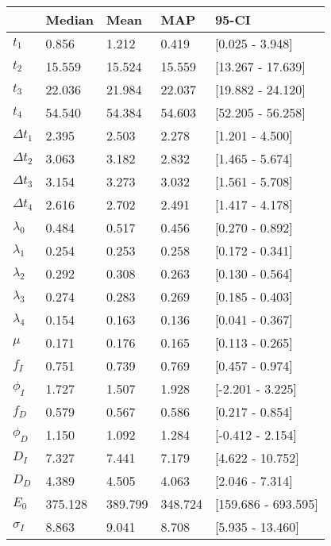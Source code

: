 \begin{tabular}{lllll}
\toprule
{} &   Median &     Mean &      MAP &                95-CI \\
\midrule
$t_1$        &    0.856 &    1.212 &    0.419 &      [0.025 - 3.948] \\
$t_2$        &   15.559 &   15.524 &   15.559 &    [13.267 - 17.639] \\
$t_3$        &   22.036 &   21.984 &   22.037 &    [19.882 - 24.120] \\
$t_4$        &   54.540 &   54.384 &   54.603 &    [52.205 - 56.258] \\
$\Delta t_1$ &    2.395 &    2.503 &    2.278 &      [1.201 - 4.500] \\
$\Delta t_2$ &    3.063 &    3.182 &    2.832 &      [1.465 - 5.674] \\
$\Delta t_3$ &    3.154 &    3.273 &    3.032 &      [1.561 - 5.708] \\
$\Delta t_4$ &    2.616 &    2.702 &    2.491 &      [1.417 - 4.178] \\
$\lambda_0$  &    0.484 &    0.517 &    0.456 &      [0.270 - 0.892] \\
$\lambda_1$  &    0.254 &    0.253 &    0.258 &      [0.172 - 0.341] \\
$\lambda_2$  &    0.292 &    0.308 &    0.263 &      [0.130 - 0.564] \\
$\lambda_3$  &    0.274 &    0.283 &    0.269 &      [0.185 - 0.403] \\
$\lambda_4$  &    0.154 &    0.163 &    0.136 &      [0.041 - 0.367] \\
$\mu$        &    0.171 &    0.176 &    0.165 &      [0.113 - 0.265] \\
$f_I$        &    0.751 &    0.739 &    0.769 &      [0.457 - 0.974] \\
$\phi_I$     &    1.727 &    1.507 &    1.928 &     [-2.201 - 3.225] \\
$f_D$        &    0.579 &    0.567 &    0.586 &      [0.217 - 0.854] \\
$\phi_D$     &    1.150 &    1.092 &    1.284 &     [-0.412 - 2.154] \\
$D_I$        &    7.327 &    7.441 &    7.179 &     [4.622 - 10.752] \\
$D_D$        &    4.389 &    4.505 &    4.063 &      [2.046 - 7.314] \\
$E_0$        &  375.128 &  389.799 &  348.724 &  [159.686 - 693.595] \\
$\sigma_I$   &    8.863 &    9.041 &    8.708 &     [5.935 - 13.460] \\

\end{tabular}

